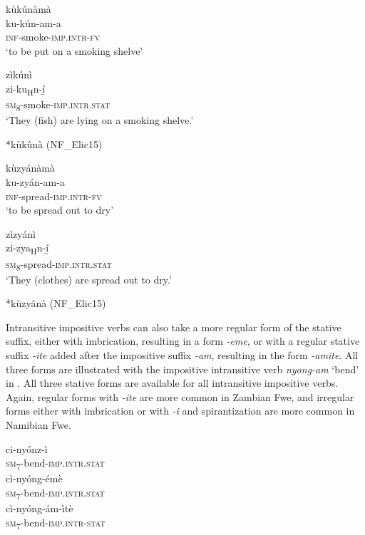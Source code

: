 \ea
\label{bkm:Ref99097698}
\ea
\glll kùkúnàmà\\
ku-kún-am-a\\
\textsc{inf}-smoke-\textsc{imp}.\textsc{intr}-\textsc{fv}\\
\glt ‘to be put on a smoking shelve’

\ex
\glll zìkúnì\\
zi-ku\textsubscript{H}n-í̲\\
\textsc{sm}\textsubscript{8}-smoke-\textsc{imp}.\textsc{intr}.\textsc{stat}\\
\glt ‘They (fish) are lying on a smoking shelve.’

\ex
*kùkûnà (NF\_Elic15)
\z\z

\ea
\label{bkm:Ref99097699}
\ea
\glll kùzyánàmà\\
ku-zyán-am-a\\
\textsc{inf}-spread-\textsc{imp}.\textsc{intr}-\textsc{fv}\\
\glt ‘to be spread out to dry’

\ex
\glll zìzyánì\\
zi-zya\textsubscript{H}n-í̲\\
\textsc{sm}\textsubscript{8}-spread-\textsc{imp}.\textsc{intr}.\textsc{stat}\\
\glt ‘They (clothes) are spread out to dry.’

\ex
*kùzyânà (NF\_Elic15)
\z\z

Intransitive impositive verbs can also take a more regular form of the stative suffix, either with imbrication, resulting in a form \textit{-eme}, or with a regular stative suffix \textit{-ite} added after the impositive suffix \textit{-am}, resulting in the form \textit{-amite}. All three forms are illustrated with the impositive intransitive verb \textit{nyong-am} ‘bend’ in . All three stative forms are available for all intransitive impositive verbs. Again, regular forms with \textit{\--ite} are more common in Zambian Fwe, and irregular forms either with imbrication or with \textit{\--i} and spirantization are more common in Namibian Fwe.

\ea
\ea
\gll ci-nyónz-ì\\
\textsc{sm}\textsubscript{7\-}-bend-\textsc{imp}.\textsc{intr}.\textsc{stat}\\

\ex
\gll cì-nyóng-émè\\
\textsc{sm}\textsubscript{7}-bend-\textsc{imp}.\textsc{intr}.\textsc{stat}\\

\ex
\gll cì-nyóng-ám-ìtè\\
\textsc{sm}\textsubscript{7}-bend-\textsc{imp}.\textsc{intr}-\textsc{stat}\\

